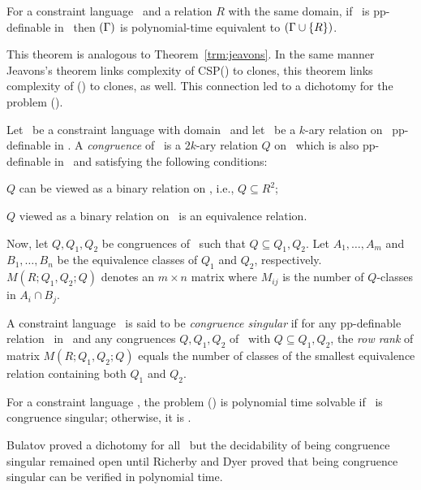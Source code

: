 \begin{theorem} 
For a constraint language \mrelset\ and a relation \(R\) with the same domain,
if \mR\ is pp-definable in \mrelset\ then \ccsp\((\Gamma)\) is polynomial-time equivalent 
to \ccsp\((\Gamma \cup \{{R}\})\)\@.
\end{theorem}

This theorem is analogous to Theorem~\ref{trm:jeavons}. In the same manner Jeavons's theorem
links complexity of CSP(\mrelset) to clones, this theorem
links complexity of \ccsp(\mrelset) to clones, as well. This connection
led to a dichotomy for the problem \ccsp(\mrelset)\@.

Let \mrelset\ be a constraint language with domain \mD\ and 
let \mR\ be a \(k\)-ary relation on \mD\ pp-definable in \mrelset\@.
A \emph{congruence} of \mR\ is a \(2k\)-ary relation \(Q\) on \mD\ 
which is also pp-definable in \mrelset\
and satisfying the following conditions:
\begin{inparaenum}[(a)]
\item \(Q\) can be viewed as a binary relation on \mR, i.e., \(Q \subseteq R^2\);
\item \(Q\) viewed as a binary relation on \mR\ is an equivalence relation.
\end{inparaenum}


Now, let \(Q,Q_1,Q_2\) be congruences of \mR\ such that
\(Q\subseteq Q_1,Q_2\). Let \(A_1,\dotsc,A_m\) and \(B_1,\dotsc,B_n\) be
the equivalence classes of \(Q_1\) and \(Q_2\), respectively. 
\(M(R;Q_1,Q_2;Q)\) denotes an \(m\times n\) matrix where \(M_{ij}\) is the number of \(Q\)-classes in
\(A_i\cap B_j\). 

A constraint language \mrelset\ is said to be \emph{congruence
 singular} if for any pp-definable relation \mR\ in \mrelset\ and any congruences
\(Q,Q_1,Q_2\) of \mR\ with \(Q\subseteq Q_1,Q_2\), the
\emph{row rank} of  matrix \(M(R;Q_1,Q_2;Q)\) equals
the number of classes of the smallest equivalence relation containing
both \(Q_1\) and \(Q_2\)\@. 

\begin{theorem}
For a constraint language \mrelset,
the problem \ccsp(\mrelset) is polynomial time solvable if 
\mrelset\ is congruence singular; otherwise, it is \cpc\@.
\end{theorem}

Bulatov proved a dichotomy for all \mrelset\ but the decidability of being congruence
singular remained open until Richerby and Dyer \cite{DyerR10} 
proved that being congruence singular can be verified in polynomial time.

